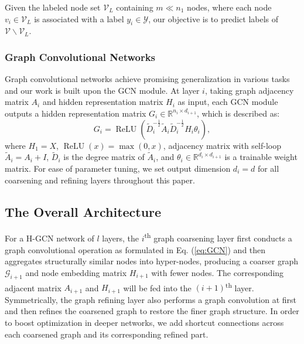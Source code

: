 \documentclass{article}
\begin{document}
Given the labeled node set $\mathcal{V}_L$ containing $m \ll n_1$ nodes, where each node $v_i \in \mathcal{V}_L$ is associated with a label $y_i \in \mathcal{Y}$, our objective is to predict labels of $\mathcal{V} \backslash \mathcal{V}_L$.

\subsubsection{Graph Convolutional Networks}

Graph convolutional networks achieve promising generalization in various tasks and our work is built upon the GCN module. At layer $i$, taking graph adjacency matrix $A_{i}$ and hidden representation matrix $H_{i}$ as input, each GCN module outputs a hidden representation matrix $G_i \in \mathbb{R}^{n_i \times d_{i+1}}$, which is described as:
\begin{equation}
	G_i = \operatorname{ReLU} \left( \tilde{D}^{-\frac {1}{2}}_{i} \tilde{A}_{i} \tilde{D}^{-\frac{1}{2}}_{i} H_{i} \theta_i \right),
	\label{eq:GCN}
\end{equation}
where $H_1 = X$, $\operatorname{ReLU}(x) = \max(0,x)$, adjacency matrix with self-loop $\tilde{A}_{i} = A_{i} + I$,  $\tilde{D}_{i}$ is the degree matrix of $\tilde{A}_{i}$, and $\theta_i \in \mathbb{R}^{d_{i} \times d_{i + 1}}$ is a trainable weight matrix. For ease of parameter tuning, we set output dimension $d_i = d$ for all coarsening and refining layers throughout this paper.

\subsection{The Overall Architecture}

For a H-GCN network of $l$ layers, the $i$\textsuperscript{th} graph coarsening layer first conducts a graph convolutional operation as formulated in Eq. (\ref{eq:GCN}) and then aggregates structurally similar nodes into hyper-nodes, producing a coarser graph $\mathcal{G}_{i+1}$ and node embedding matrix $H_{i+1}$ with fewer nodes. The corresponding adjacent matrix $A_{i+1}$ and $H_{i+1}$ will be fed into the $(i + 1)$\textsuperscript{th} layer. Symmetrically, the graph refining layer also performs a graph convolution at first and then refines the coarsened graph to restore the finer graph structure. In order to boost optimization in deeper networks, we add shortcut connections \cite{7780459} across each coarsened graph and its corresponding refined part.
\end{document}
